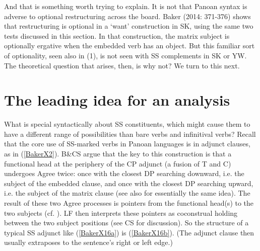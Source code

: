 \documentclass[output=paper,colorlinks,citecolor=brown,
]{langscibook}
\begin{document}
And that is something worth trying to explain. It is not that Panoan syntax is adverse to optional restructuring across the board. Baker (2014: 371-376) shows that restructuring is optional in a ‘want’ construction in SK, using the same two tests discussed in this section. In that construction, the matrix subject is optionally ergative when the embedded verb has an object. But this familiar sort of optionality, seen also in (1), is not seen with SS complements in SK or YW. The theoretical question that arises, then, is why not? We turn to this next.

\section{The leading idea for an analysis}

What is special syntactically about SS constituents, which might cause them to have a different range of possibilities than bare verbs and
infinitival verbs? Recall that the core use of SS-marked verbs in Panoan languages is in adjunct clauses, as in (\ref{BakerX2}). B\&CS argue that the key to this construction is that a functional head at the periphery of the CP adjunct (a fusion of T and C) undergoes Agree twice: once with the closest DP searching downward, i.e. the subject of the embedded clause, and once with the closest DP searching upward, i.e. the subject of the matrix clause (see also \citet{arregi2019switch} for essentially the same idea). The result of these two Agree processes is pointers from the functional head(s) to the two subjects (cf. \citealt{arregi2012morphotactics}). LF then interprets these pointers as coconstrual holding between the two subject positions (see CS for discussion). So the structure of a typical SS adjunct like (\ref{BakerX16a}) is (\ref{BakerX16b}). (The adjunct clause then usually extraposes to the sentence’s right or left edge.)
\end{document}
